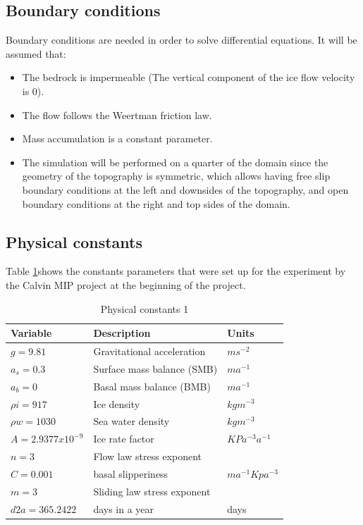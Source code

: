 \documentclass{article}
\begin{document}
\subsection{Boundary conditions}
Boundary conditions are needed in order to solve differential equations. It will be assumed that:
\begin{itemize}
	\item The bedrock is impermeable (The vertical component of the ice flow velocity is 0). 
	\item The flow follows the Weertman friction law.
	\item Mass accumulation is a constant parameter.
	\item The simulation will be performed on a quarter of the domain since the geometry of the topography is symmetric, which allows having free slip boundary conditions at the left and downsides of the topography, and open boundary conditions at the right and top sides of the domain. 
\end{itemize}
\subsection{Physical constants}
Table \ref{Physical constants 1}shows the constants parameters that were set up for the experiment by the Calvin MIP project at the beginning of the project. 
\begin{table}[!h]
\begin{center}
\caption{Physical constants 1}
\label{Physical constants 1}
\begin{tabular}{|l|l|l|}
\hline
Variable          & Description                 & Units           \\ \hline
$g=9.81$         & Gravitational acceleration  & $ms^{-2}$         \\ \hline
$a_s=0.3$       & Surface mass balance (SMB)  & $ma^{-1}$         \\ \hline
$a_b=0$             & Basal mass balance (BMB)    & $ma^{-1}$         \\ \hline
$\rho i=917$        & Ice density                 & $kg m^{-3}$       \\ \hline
$\rho w=1030$      & Sea water density           & $kg m^{-3}$       \\ \hline
$A= 2.9377x10^{-9}$ & Ice rate factor             & $KPa^{-3}a^{-1}$  \\ \hline
$n=3$               & Flow law stress exponent    &                 \\ \hline
$C=0.001$           & basal slipperiness          & $ma^{-1}Kpa^{-3}$ \\ \hline
$m=3$               & Sliding law stress exponent &                 \\ \hline
$d2a=365.2422$     & days in a year           & days         \\ \hline
\end{tabular}
\end{center}
\end{table}
\end{document}
